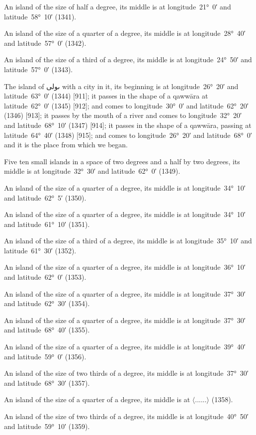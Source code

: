 \documentclass[11pt]{article}
\newcommand{\Pg}[1]{\marginpar{\footnotesize #1}}
\newcommand{\Ang}[1]{\ensuremath{#1}}
\begin{document}
An island of the size of half a degree, its middle is at longitude~21°~0′ and latitude~58°~10′ (1341).

An island of the size of a quarter of a degree, its middle is at longitude~28°~40′ and latitude~57°~0′ (1342).

An island of the size of a third of a degree, its middle is at longitude~24°~50′ and latitude~57°~0′ (1343).

The island of \textarabic{ٮولى} with a city in it, its beginning is at longitude~26°~20′ and latitude~63°~0′ (1344) [911]; it passes in the shape of a qawwāra at latitude~62°~0′ (1345) [912]; and comes to longitude~30°~0′ and latitude~62°~20′ (1346) [913]\Pg{p. 88}; it passes by the mouth of a river and comes to longitude~32°~20′ and latitude~68°~10′ (1347) [914]; it passes in the shape of a qawwāra, passing at latitude~64°~40′ (1348) [915]; and comes to longitude~26°~20′ and latitude~68°~0′ and it is the place from which we began.

Five ten small islands in a space of two degrees and a half by two degrees, its middle is at longitude~32°~30′ and latitude~62°~0′ (1349).

An island of the size of a quarter of a degree, its middle is at longitude~34°~10′ and latitude~62°~5′ (1350).

An island of the size of a quarter of a degree, its middle is at longitude~34°~10′ and latitude~61°~10′ (1351).

An island of the size of a third of a degree, its middle is at longitude~35°~10′ and latitude~61°~30′ (1352).

An island of the size of a quarter of a degree, its middle is at longitude~36°~10′ and latitude~62°~0′ (1353).

An island of the size of a quarter of a degree, its middle is at longitude~37°~30′ and latitude~62°~30′ (1354).

An island of the size of a quarter of a degree, its middle is at longitude~37°~30′ and latitude~68°~40′ (1355).

An island of the size of a quarter of a degree, its middle is at longitude~39°~40′ and latitude~59°~0′ (1356).

An island of the size of two thirds of a degree, its middle is at longitude~37°~30′ and latitude~68°~30′ (1357).

An island of the size of a quarter of a degree, its middle is at \Ang{\langle}......\Ang{\rangle} (1358).

An island of the size of two thirds of a degree, its middle is at longitude~40°~50′ and latitude~59°~10′ (1359).
\end{document}
